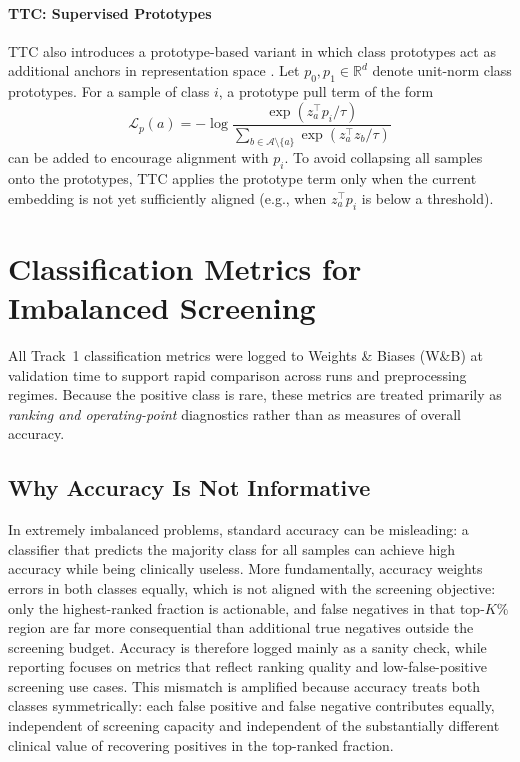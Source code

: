 \paragraph{TTC: Supervised Prototypes}
TTC also introduces a prototype-based variant in which class prototypes act as additional anchors in representation space \parencite{ttc_2025}.
Let $p_0, p_1 \in \mathbb{R}^{d}$ denote unit-norm class prototypes.
For a sample of class $i$, a prototype pull term of the form
\begin{equation}
  \mathcal{L}_{p}(a)
  = -\log \frac{\exp\!\left(z_a^\top p_{i} / \tau\right)}
  {\sum\limits_{b \in \mathcal{A}\setminus\{a\}} \exp\!\left(z_a^\top z_{b} / \tau\right)}
  \label{eq:proto-pull}
\end{equation}
can be added to encourage alignment with $p_i$.
To avoid collapsing all samples onto the prototypes, TTC applies the prototype term only when the current embedding is not yet sufficiently aligned (e.g., when $z_a^\top p_i$ is below a threshold).

\section{Classification Metrics for Imbalanced Screening}
All Track~1 classification metrics were logged to Weights \& Biases (W\&B) at validation time to support rapid comparison across runs and preprocessing regimes.
Because the positive class is rare, these metrics are treated primarily as \emph{ranking and operating-point} diagnostics rather than as measures of overall accuracy.

\subsection{Why Accuracy Is Not Informative}
In extremely imbalanced problems, standard accuracy can be misleading: a classifier that predicts the majority class for all samples can achieve high accuracy while being clinically useless.
More fundamentally, accuracy weights errors in both classes equally, which is not aligned with the screening objective: only the highest-ranked fraction is actionable, and false negatives in that top-$K\%$ region are far more consequential than additional true negatives outside the screening budget.
Accuracy is therefore logged mainly as a sanity check, while reporting focuses on metrics that reflect ranking quality and low-false-positive screening use cases.
This mismatch is amplified because accuracy treats both classes symmetrically: each false positive and false negative contributes equally, independent of screening capacity and independent of the substantially different clinical value of recovering positives in the top-ranked fraction.

